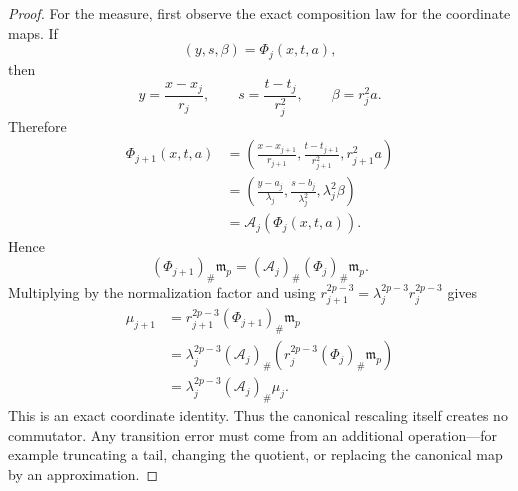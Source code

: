 \documentclass[11pt]{article}
\theoremstyle{definition}\newtheorem{definition}[theorem]{Definition}
\theoremstyle{remark}\newtheorem{remark}[theorem]{Remark}
\begin{document}
\begin{proof}
For the measure, first observe the exact composition law for the coordinate
maps.  If
\[
(y,s,\beta)=\Phi_j(x,t,a),
\]
then
\[
y=\frac{x-x_j}{r_j},\qquad
s=\frac{t-t_j}{r_j^2},\qquad
\beta=r_j^2a.
\]
Therefore
\[
\begin{aligned}
\Phi_{j+1}(x,t,a)
&=\left(
\frac{x-x_{j+1}}{r_{j+1}},
\frac{t-t_{j+1}}{r_{j+1}^2},
r_{j+1}^2a
\right)\\
&=\left(
\frac{y-a_j}{\lambda_j},
\frac{s-b_j}{\lambda_j^2},
\lambda_j^2\beta
\right)\\
&=\mathcal A_j(\Phi_j(x,t,a)).
\end{aligned}
\]
Hence
\[
(\Phi_{j+1})_\#\mathfrak m_p
=(\mathcal A_j)_\#(\Phi_j)_\#\mathfrak m_p.
\]
Multiplying by the normalization factor and using
$r_{j+1}^{2p-3}=\lambda_j^{2p-3}r_j^{2p-3}$ gives
\[
\begin{aligned}
\mu_{j+1}
&=r_{j+1}^{2p-3}(\Phi_{j+1})_\#\mathfrak m_p\\
&=\lambda_j^{2p-3}(\mathcal A_j)_\#
\left(r_j^{2p-3}(\Phi_j)_\#\mathfrak m_p\right)\\
&=\lambda_j^{2p-3}(\mathcal A_j)_\#\mu_j.
\end{aligned}
\]
This is an exact coordinate identity.  Thus the canonical rescaling itself
creates no commutator.  Any transition error must come from an additional
operation---for example truncating a tail, changing the quotient, or replacing
the canonical map by an approximation.
\end{proof}
\end{document}
